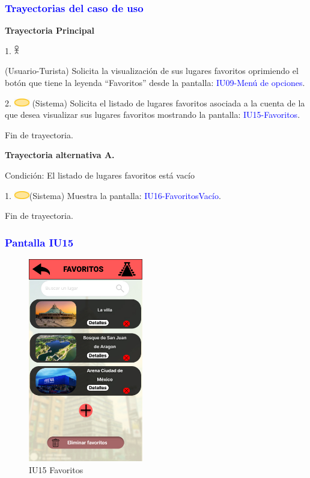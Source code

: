 \pagebreak
\subsubsection{\textcolor{blue}{Trayectorias del caso de uso}}
\textbf{Trayectoria Principal}{

     1. \includegraphics[width=0.0150\textwidth]{Figuras/persona.png}{
        (Usuario-Turista)
        Solicita la visualización de sus lugares favoritos oprimiendo el botón que tiene la leyenda “Favoritos” desde la pantalla: \textcolor{blue}{IU09-Menú de opciones}.
     
     }
    
      2. \includegraphics[width=0.0500\textwidth]{Figuras/sistema.png} {
        (Sistema) Solicita el listado de lugares favoritos asociada a la cuenta de la que desea visualizar sus lugares favoritos mostrando la pantalla: \textcolor{blue}{IU15-Favoritos}.
      }

      Fin de trayectoria.
}


\par
\vspace{1cm}
\textbf{Trayectoria alternativa A.}{
    {\scriptsize Condición: El listado de lugares favoritos está vacío}
    \par
    1. \includegraphics[width=0.05\textwidth]{Figuras/sistema.png}{(Sistema) Muestra la pantalla: \textcolor{blue}{IU16-FavoritosVacío}.
    }
    \par
    Fin de trayectoria.
}




\subsubsection{\textcolor{blue}{Pantalla IU15}}

    \begin{figure}[htb]
        \centering
        \includegraphics[width= 5cm]{Pantallas Prototipo3/IU23 Pantalla Favoritos.jpg}
        \caption{IU15 Favoritos}
        \label{fig:enter-label}
    \end{figure}

